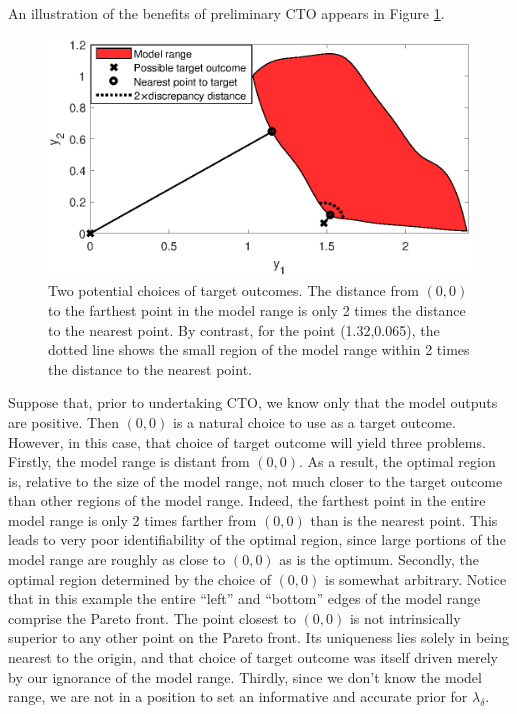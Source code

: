 \documentclass[12pt]{article}
\begin{document}
An illustration of the benefits of preliminary CTO appears in Figure \ref{fig:do_selection_example}.
%
\begin{figure}
\centering
\includegraphics[scale=.8]{FIG_des_obs_selection_example.eps}
\caption{Two potential choices of target outcomes. 
%
The distance from $(0,0)$ to the farthest point in the model range is only 2 times the distance to the nearest point. 
%
By contrast, for the point (1.32,0.065), the dotted line shows the small region of the model range within 2 times the distance to the nearest point.}
\label{fig:do_selection_example}
\end{figure}
%
Suppose that, prior to undertaking CTO, we know only that the model outputs are positive.
%
Then $(0,0)$ is a natural choice to use as a target outcome.
%
However, in this case, that choice of target outcome will yield three problems.
%
Firstly, the model range is distant from $(0,0)$.
%
As a result, the optimal region is, relative to the size of the model range, not much closer to the target outcome than other regions of the model range.
%
Indeed, the farthest point in the entire model range is only 2 times farther from $(0,0)$ than is the nearest point.
%
This leads to very poor identifiability of the optimal region, since large portions of the model range are roughly as close to $(0,0)$ as is the optimum.
%
Secondly, the optimal region determined by the choice of $(0,0)$ is somewhat arbitrary.
%
Notice that in this example the entire ``left'' and ``bottom''  edges of the model range comprise the Pareto front.
%
The point closest to $(0,0)$ is not intrinsically superior to any other point on the Pareto front.
%
Its uniqueness lies solely in being nearest to the origin, and that choice of target outcome was itself driven merely by our ignorance of the model range.
%
Thirdly, since we don't know the model range, we are not in a position to set an informative and accurate prior for $\lambda_\delta$.
\end{document}
